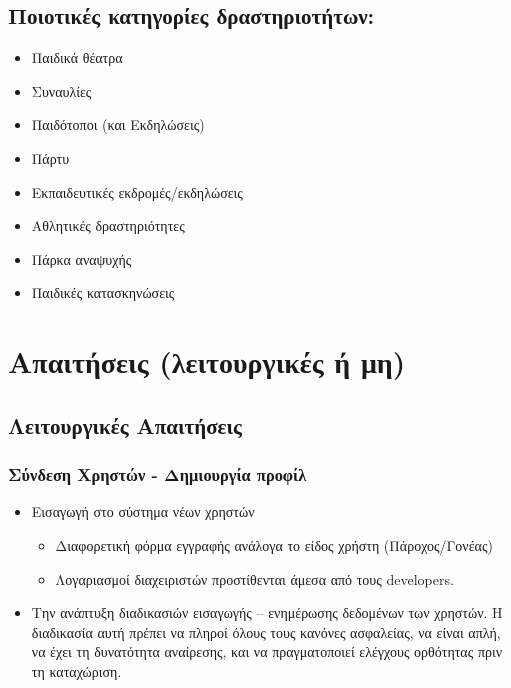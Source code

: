 \documentclass[letterpaper,6pt]{article}
\begin{document}
\subsection{Ποιοτικές κατηγορίες δραστηριοτήτων:}
\begin{itemize}
  \item Παιδικά θέατρα
  \item Συναυλίες
  \item Παιδότοποι (και Εκδηλώσεις) 
  \item Πάρτυ
  \item Εκπαιδευτικές εκδρομές/εκδηλώσεις
  \item Αθλητικές δραστηριότητες
  \item Πάρκα αναψυχής
  \item Παιδικές κατασκηνώσεις
\end{itemize}


\section{Απαιτήσεις (λειτουργικές ή μη)}

\subsection{Λειτουργικές Απαιτήσεις}

\subsubsection{Σύνδεση Χρηστών - Δημιουργία προφίλ}

\begin{itemize}
  \item Εισαγωγή στο σύστημα νέων χρηστών
    \begin{itemize}
      \item Διαφορετική φόρμα εγγραφής ανάλογα το είδος χρήστη (Πάροχος/Γονέας)
	     \item Λογαριασμοί διαχειριστών προστίθενται άμεσα από τους developers.
    \end{itemize}
  \item Την ανάπτυξη διαδικασιών εισαγωγής – ενημέρωσης δεδομένων των χρηστών. Η διαδικασία αυτή πρέπει να πληροί όλους τους κανόνες ασφαλείας, να είναι απλή, να έχει τη δυνατότητα αναίρεσης, και να πραγματοποιεί ελέγχους ορθότητας πριν τη καταχώριση.
\end{itemize}
\end{document}
